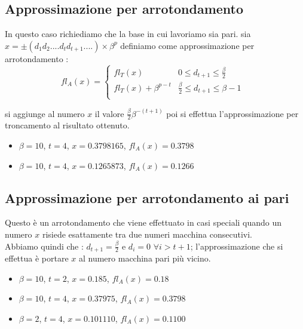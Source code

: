 \documentclass[12pt, a4paper]{book}
\theoremstyle{definition}
\begin{document}
\subsection{Approssimazione per arrotondamento}
\begin{flushleft}
In questo caso richiediamo che la base in cui lavoriamo sia pari.
sia $x = \pm(d_{1}d_{2}....d_{t}d_{t+1}....)\times \beta^{p}$ definiamo come approssimazione per arrotondamento :
\[
fl_{A}(x) = 
\begin{cases}
  fl_{T}(x) & \text{$0 \leq d_{t+1} \leq \frac{\beta}{2}$ } \\
  fl_{T}(x) + \beta^{p-t} & \text{$\frac{\beta}{2} \leq d_{t+1} \leq \beta - 1$ } \\
\end{cases}
\]

si aggiunge al numero $x$ il valore $\frac{\beta}{2}\beta^{-(t+1)}$ poi si effettua l'approssimazione per troncamento al risultato ottenuto.
\end{flushleft}

\begin{itemize}
  	\item $\beta = 10$,  $t=4$,  $x = 0.3798165$,  $fl_{A}(x) =  0.3798$
  	\item $\beta = 10$,  $t=4$,  $x = 0.1265873$,  $fl_{A}(x) =  0.1266$
\end{itemize}

\subsection{Approssimazione per arrotondamento ai pari}
\begin{flushleft}
Questo è un arrotondamento che viene effettuato in casi speciali quando un numero $x$ risiede esattamente tra due numeri macchina consecutivi.\\
Abbiamo quindi che : $d_{t+1} = \frac{\beta}{2}$ e $d_{i} = 0$ $\forall i > t + 1$; l'approssimazione che si effettua è portare $x$ al numero macchina pari più vicino.  

\begin{itemize}
  	\item $\beta = 10$,  $t=2$,  $x = 0.185 $,  $fl_{A}(x) =  0.18$
  	\item $\beta = 10$,  $t=4$,  $x = 0.37975 $,  $fl_{A}(x) =  0.3798$
  	\item $\beta = 2$,  $t=4$,  $x = 0.101110$,  $fl_{A}(x) =  0.1100$
\end{itemize}
\end{flushleft}
\newpage
\end{document}
